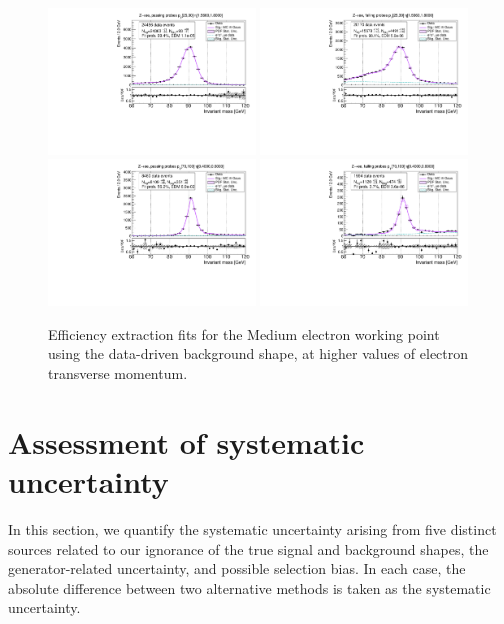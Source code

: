 {\begin{figure}
\centering
\includegraphics[width=0.49\textwidth]{figures/Zee_RecoTemplate_BkgLPiEMu_pass_ptBin3_etaBin23.pdf}
\includegraphics[width=0.49\textwidth]{figures/Zee_RecoTemplate_BkgLPiEMu_fail_ptBin3_etaBin23.pdf}
\includegraphics[width=0.49\textwidth]{figures/Zee_RecoTemplate_BkgLPiEMu_pass_ptBin14_etaBin17.pdf}
\includegraphics[width=0.49\textwidth]{figures/Zee_RecoTemplate_BkgLPiEMu_fail_ptBin14_etaBin17.pdf}
\caption{Efficiency extraction fits for the Medium electron working point using the data-driven background shape, at higher values of electron transverse momentum.}
\label{fig:ZeeNominalFits2}
\end{figure}

\section{Assessment of systematic uncertainty}
\label{sec:tnpsyst}
In this section, we quantify the systematic uncertainty arising from five distinct sources related to our ignorance
of the true signal and background shapes, the generator-related uncertainty, and possible selection bias.
In each case, the absolute difference between two alternative methods is taken as the systematic uncertainty.

}
